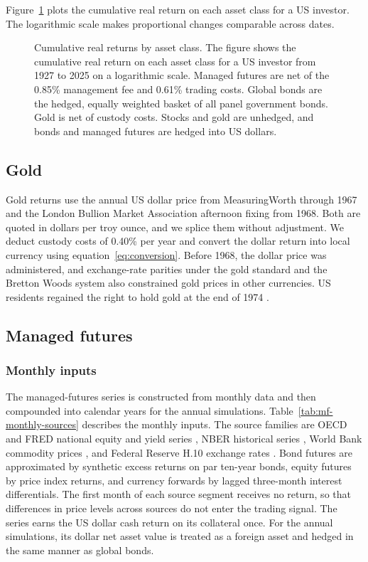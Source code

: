 Figure~\ref{fig:cumwealth} plots the cumulative real return on each asset class for a US investor. The
logarithmic scale makes proportional changes comparable across dates.

\begin{figure}[p]
\centering

\caption{Cumulative real returns by asset class. The figure shows the cumulative real return on each asset
class for a US investor from 1927 to 2025 on a logarithmic scale. Managed futures are net of the 0.85\%
management fee and 0.61\% trading costs. Global bonds are the hedged, equally weighted basket of all panel
government bonds. Gold is net of custody costs. Stocks and gold are unhedged, and bonds and managed
futures are hedged into US dollars.}
\label{fig:cumwealth}
\end{figure}

\subsection{Gold}
\label{app:gold}

Gold returns use the annual US dollar price from MeasuringWorth \citep{OfficerWilliamsonMeasuringWorth}
through 1967 and the London Bullion Market Association afternoon fixing \citep{LBMA} from 1968. Both are
quoted in dollars per troy ounce, and we splice them without adjustment. We deduct custody costs of 0.40\%
per year and convert the dollar return into local currency using equation~\eqref{eq:conversion}. Before
1968, the dollar price was administered, and exchange-rate parities under the gold standard and the
Bretton Woods system also constrained gold prices in other currencies. US residents regained the right to
hold gold at the end of 1974 \citep{USMintGold1974}.

\subsection{Managed futures}
\label{app:mf-proxy}

\subsubsection{Monthly inputs}
\label{app:mf-monthly-data}

The managed-futures series is constructed from monthly data and then compounded into calendar years for
the annual simulations. Table~\ref{tab:mf-monthly-sources} describes the monthly inputs. The source
families are OECD and FRED national equity and yield series \citep{OECDMEI,FRED}, NBER historical series
\citep{NBERMacrohistory}, World Bank commodity prices \citep{WorldBankPinkSheet}, and Federal Reserve H.10
exchange rates \citep{FedH10}. Bond futures are approximated by synthetic excess returns on par ten-year
bonds, equity futures by price index returns, and currency forwards by lagged three-month interest
differentials. The first month of each source segment receives no return, so that differences in price
levels across sources do not enter the trading signal. The series earns the US dollar cash return on its
collateral once. For the annual simulations, its dollar net asset value is treated as a foreign asset and
hedged in the same manner as global bonds.

